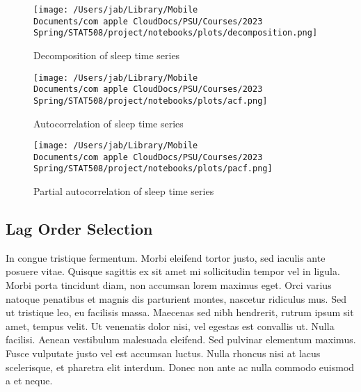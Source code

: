 \documentclass{article}
\begin{document}
\begin{figure}[hb]
\centering
  \texttt{[image: /Users/jab/Library/Mobile Documents/com~apple~CloudDocs/PSU/Courses/2023 Spring/STAT508/project/notebooks/plots/decomposition.png]}
\caption{Decomposition of sleep time series}
\label{Decomposition}
\end{figure}

\begin{figure}[hb]
  \centering
  \texttt{[image: /Users/jab/Library/Mobile Documents/com~apple~CloudDocs/PSU/Courses/2023 Spring/STAT508/project/notebooks/plots/acf.png]}
\caption{Autocorrelation of sleep time series}
\end{figure}

\begin{figure}[hb]
\centering
  \texttt{[image: /Users/jab/Library/Mobile Documents/com~apple~CloudDocs/PSU/Courses/2023 Spring/STAT508/project/notebooks/plots/pacf.png]}
\caption{Partial autocorrelation of sleep time series}
\end{figure}

\hypertarget{lag-order-selection}{%
\subsection{Lag Order Selection}\label{lag-order-selection}}

In congue tristique fermentum. Morbi eleifend tortor justo, sed iaculis
ante posuere vitae. Quisque sagittis ex sit amet mi sollicitudin tempor
vel in ligula. Morbi porta tincidunt diam, non accumsan lorem maximus
eget. Orci varius natoque penatibus et magnis dis parturient montes,
nascetur ridiculus mus. Sed ut tristique leo, eu facilisis massa.
Maecenas sed nibh hendrerit, rutrum ipsum sit amet, tempus velit. Ut
venenatis dolor nisi, vel egestas est convallis ut. Nulla facilisi.
Aenean vestibulum malesuada eleifend. Sed pulvinar elementum maximus.
Fusce vulputate justo vel est accumsan luctus. Nulla rhoncus nisi at
lacus scelerisque, et pharetra elit interdum. Donec non ante ac nulla
commodo euismod a et neque.
\end{document}

